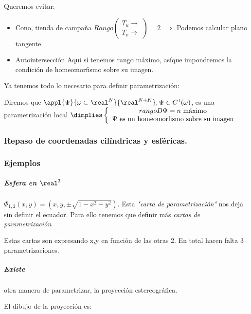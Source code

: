 Queremos evitar:

\begin{itemize}
\item Cono, tienda de campaña
$Rango \begin{pmatrix}
T_u \rightarrow\\
T_v \rightarrow
\end{pmatrix} = 2 \implies $ Podemos calcular plano tangente
\item Autointersección
Aquí sí tenemos rango máximo, asíque impondremos la condición de homeomorfismo sobre su imagen.
\end{itemize}

Ya tenemos todo lo necesario para definir parametrización:

\begin{defn}
Diremos que $\appl{\Psi}{\omega \subset \real^N}{\real^{N+K}}, \Psi \in C^1(\omega)$, es una parametrización local $\dimplies \left\{ \begin{array}{c}
 rango D\Psi = n \text{ máximo}\\
 \Psi \text{ es un homeomorfismo sobre su imagen}
\end{array}\right.$
\end{defn}



\subsubsection{Repaso de coordenadas cilíndricas y esféricas.}


\subsubsection{Ejemplos}

\subparagraph{Esfera en $\real^3$}
 $\Phi_{1,2}(x,y) = (x,y,\pm \sqrt{1-x^2-y^2})$. Esta \emph{"carta de parametrización"} nos deja sin definir el ecuador. Para ello tenemos que definir más \emph{cartas de parametrización} 
 
 Estas cartas son expresando x,y en función de las otras 2. En total hacen falta 3 parametrizaciones.
 
 \subparagraph{Existe} otra manera de parametrizar, la proyección estereográfica.  

El dibujo de la proyección es:

 
 
